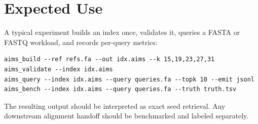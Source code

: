 \documentclass[11pt]{article}
\begin{document}
\section{Expected Use}

A typical experiment builds an index once, validates it, queries a FASTA or FASTQ workload, and records per-query metrics:
\begin{verbatim}
aims_build --ref refs.fa --out idx.aims --k 15,19,23,27,31
aims_validate --index idx.aims
aims_query --index idx.aims --query queries.fa --topk 10 --emit jsonl
aims_bench --index idx.aims --query queries.fa --truth truth.tsv
\end{verbatim}

The resulting output should be interpreted as exact seed retrieval. Any downstream alignment handoff should be benchmarked and labeled separately.
\end{document}
